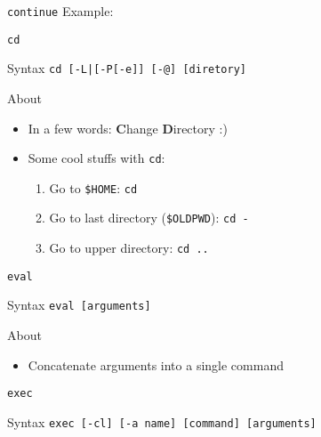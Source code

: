 \documentclass[10pt, compress, aspectratio=169]{beamer}
\begin{document}
\begin{frame}{\texttt{continue}}
  Example:
  
\end{frame}

\begin{frame}{\texttt{cd}}
  \begin{alertblock}{Syntax}
    \texttt{cd [-L|[-P[-e]] [-@] [diretory]}
  \end{alertblock}

  \begin{exampleblock}{About}
    \begin{itemize}
      \item In a few words: \textbf{C}hange \textbf{D}irectory :)
      \item Some cool stuffs with \texttt{cd}:
        \begin{enumerate}
          \item Go to \texttt{\$HOME}: \texttt{cd}
          \item Go to last directory (\texttt{\$OLDPWD}): \texttt{cd -}
          \item Go to upper directory: \texttt{cd ..}
        \end{enumerate}
    \end{itemize}
  \end{exampleblock}
\end{frame}

\begin{frame}{\texttt{eval}}
  \begin{alertblock}{Syntax}
    \texttt{eval [arguments]}
  \end{alertblock}

  \begin{exampleblock}{About}
    \begin{itemize}
      \item Concatenate arguments into a single command
    \end{itemize}
  \end{exampleblock}

  
\end{frame}

\begin{frame}{\texttt{exec}}
  \begin{alertblock}{Syntax}
    \texttt{exec [-cl] [-a name] [command] [arguments]}
  \end{alertblock}
  
\end{frame}
\end{document}
